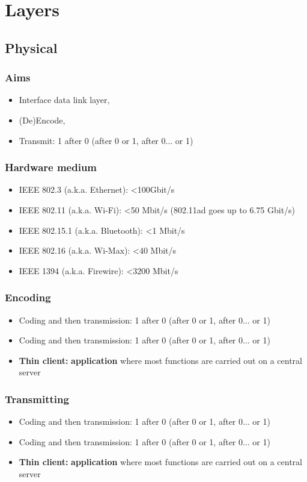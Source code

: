 \section{Layers}
\subsection{Physical}
  \begin{frame}
    \frametitle{Aims}
      \begin{itemize}
        \item Interface data link layer,\pause
        \item (De)Encode,\pause
        \item Transmit: 1 after 0 (after 0 or 1, after 0... or 1)
      \end{itemize}
  \end{frame}
  \begin{frame}
    \frametitle{Hardware medium}
      \begin{itemize}
        \item IEEE 802.3 (a.k.a. Ethernet): <100Gbit/s \pause
        \item IEEE 802.11 (a.k.a. Wi-Fi): <50 Mbit/s (802.11ad goes up to 6.75 Gbit/s) \pause
        \item IEEE 802.15.1 (a.k.a. Bluetooth): <1 Mbit/s \pause
        \item IEEE 802.16 (a.k.a. Wi-Max): <40 Mbit/s \pause
        \item IEEE 1394 (a.k.a. Firewire): <3200 Mbit/s
      \end{itemize}
  \end{frame}
  \begin{frame}
    \frametitle{Encoding}
      \begin{itemize}
        \item Coding and then transmission: 1 after 0 (after 0 or 1, after 0... or 1)\pause
        \item Coding and then transmission: 1 after 0 (after 0 or 1, after 0... or 1)\pause
        \item \textbf{Thin client:} \textbf{application} where most functions are carried out on a central server
      \end{itemize}
  \end{frame}
  \begin{frame}
    \frametitle{Transmitting}
      \begin{itemize}
        \item Coding and then transmission: 1 after 0 (after 0 or 1, after 0... or 1)\pause
        \item Coding and then transmission: 1 after 0 (after 0 or 1, after 0... or 1)\pause
        \item \textbf{Thin client:} \textbf{application} where most functions are carried out on a central server
      \end{itemize}
  \end{frame}
